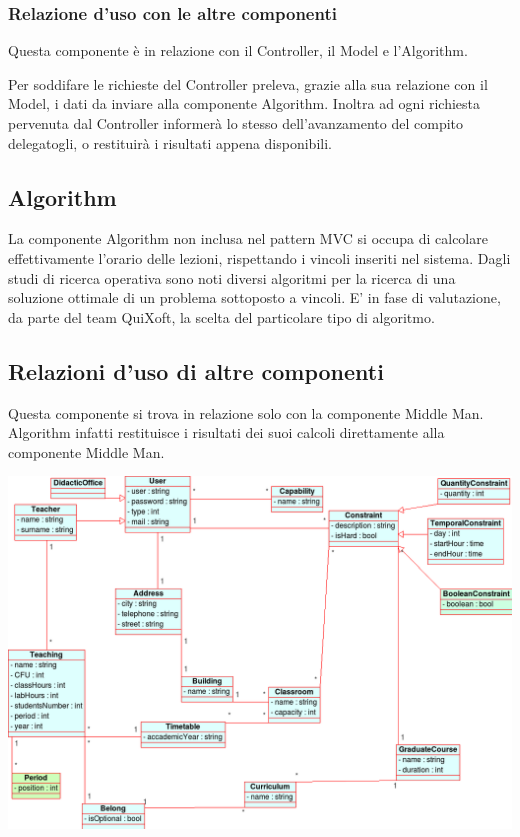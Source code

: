 \documentclass[11pt,a4paper]{article}
\begin{document}
\subsubsection{Relazione d'uso con le altre componenti}
Questa componente è in relazione con il Controller, il Model e l'Algorithm. 

Per soddifare le richieste del Controller preleva, grazie alla sua relazione con il Model, i dati da inviare alla componente Algorithm. Inoltra ad ogni richiesta pervenuta dal Controller informerà lo stesso dell'avanzamento del compito delegatogli, o restituirà i risultati appena disponibili.
\subsection{Algorithm}
La componente Algorithm non inclusa nel pattern MVC si occupa di calcolare effettivamente l'orario delle lezioni, rispettando i vincoli inseriti nel sistema. Dagli studi di ricerca operativa sono noti diversi algoritmi per la ricerca di una soluzione ottimale di un problema sottoposto a vincoli. E' in fase di valutazione, da parte del team QuiXoft, la scelta del particolare tipo di algoritmo.
\subsection{Relazioni d'uso di altre componenti}
Questa componente si trova in relazione solo con la componente Middle Man. Algorithm infatti restituisce i risultati dei suoi calcoli direttamente alla componente Middle Man.

\begin{center}
\includegraphics[scale=0.3]{images/class_diagram.png}
\end{center}
\end{document}
